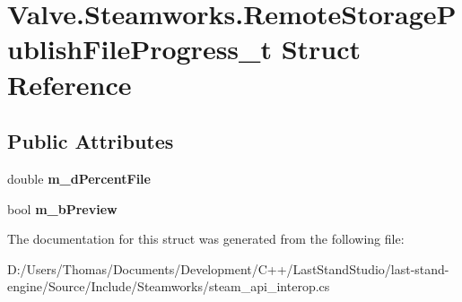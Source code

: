 \hypertarget{structValve_1_1Steamworks_1_1RemoteStoragePublishFileProgress__t}{}\section{Valve.\+Steamworks.\+Remote\+Storage\+Publish\+File\+Progress\+\_\+t Struct Reference}
\label{structValve_1_1Steamworks_1_1RemoteStoragePublishFileProgress__t}
\subsection*{Public Attributes}
\begin{DoxyCompactItemize}
\item 
\hypertarget{structValve_1_1Steamworks_1_1RemoteStoragePublishFileProgress__t_a89f1669ee6b0764e44f917d9d11a8732}{}double {\bfseries m\+\_\+d\+Percent\+File}\label{structValve_1_1Steamworks_1_1RemoteStoragePublishFileProgress__t_a89f1669ee6b0764e44f917d9d11a8732}

\item 
\hypertarget{structValve_1_1Steamworks_1_1RemoteStoragePublishFileProgress__t_a46c3f2162e61d12fbec1e03c3eed3003}{}bool {\bfseries m\+\_\+b\+Preview}\label{structValve_1_1Steamworks_1_1RemoteStoragePublishFileProgress__t_a46c3f2162e61d12fbec1e03c3eed3003}

\end{DoxyCompactItemize}


The documentation for this struct was generated from the following file\+:\begin{DoxyCompactItemize}
\item 
D\+:/\+Users/\+Thomas/\+Documents/\+Development/\+C++/\+Last\+Stand\+Studio/last-\/stand-\/engine/\+Source/\+Include/\+Steamworks/steam\+\_\+api\+\_\+interop.\+cs\end{DoxyCompactItemize}
